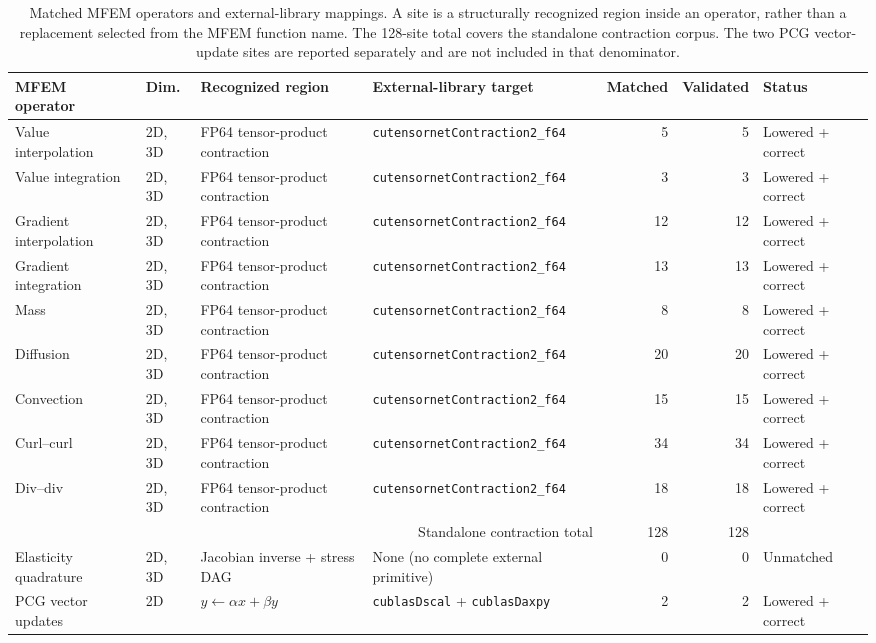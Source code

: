 % 
\begin{table}[t]
  \centering
  \caption{Matched MFEM operators and external-library mappings.  A site is a
  structurally recognized region inside an operator, rather than a replacement
  selected from the MFEM function name.  The 128-site total covers the
  standalone contraction corpus.  The two PCG vector-update sites are reported
  separately and are not included in that denominator.}
  \label{tab:mfem-library-mappings}
  \scriptsize
  \setlength{\tabcolsep}{4pt}
  \begin{tabular}{@{}llp{3.1cm}p{4.3cm}rrl@{}}
    \toprule
    MFEM operator & Dim. & Recognized region & External-library target &
      Matched & Validated & Status \\
    \midrule
    Value interpolation    & 2D, 3D & FP64 tensor-product contraction &
      \texttt{cutensornetContraction2\_f64} & 5  & 5  & Lowered + correct \\
    Value integration      & 2D, 3D & FP64 tensor-product contraction &
      \texttt{cutensornetContraction2\_f64} & 3  & 3  & Lowered + correct \\
    Gradient interpolation & 2D, 3D & FP64 tensor-product contraction &
      \texttt{cutensornetContraction2\_f64} & 12 & 12 & Lowered + correct \\
    Gradient integration   & 2D, 3D & FP64 tensor-product contraction &
      \texttt{cutensornetContraction2\_f64} & 13 & 13 & Lowered + correct \\
    Mass                   & 2D, 3D & FP64 tensor-product contraction &
      \texttt{cutensornetContraction2\_f64} & 8  & 8  & Lowered + correct \\
    Diffusion              & 2D, 3D & FP64 tensor-product contraction &
      \texttt{cutensornetContraction2\_f64} & 20 & 20 & Lowered + correct \\
    Convection             & 2D, 3D & FP64 tensor-product contraction &
      \texttt{cutensornetContraction2\_f64} & 15 & 15 & Lowered + correct \\
    Curl--curl             & 2D, 3D & FP64 tensor-product contraction &
      \texttt{cutensornetContraction2\_f64} & 34 & 34 & Lowered + correct \\
    Div--div               & 2D, 3D & FP64 tensor-product contraction &
      \texttt{cutensornetContraction2\_f64} & 18 & 18 & Lowered + correct \\
    \midrule
    \multicolumn{4}{r}{Standalone contraction total} & 128 & 128 & \\
    \midrule
    Elasticity quadrature  & 2D, 3D & Jacobian inverse + stress DAG &
      None (no complete external primitive) & 0 & 0 & Unmatched \\
    PCG vector updates     & 2D & $y \leftarrow \alpha x + \beta y$ &
      \texttt{cublasDscal} + \texttt{cublasDaxpy} & 2 & 2 & Lowered + correct \\
    \bottomrule
  \end{tabular}
\end{table}
